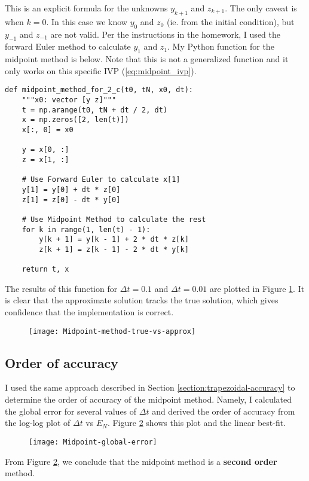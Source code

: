\documentclass{article}
\begin{document}
This is an explicit formula for the unknowns $y_{k+1}$ and $z_{k+1}$. The only caveat is when $k = 0$.  In this case we know $y_0$ and $z_0$ (ie. from the initial condition), but $y_{-1}$ and $z_{-1}$ are not valid.  Per the instructions in the homework, I used the forward Euler method to calculate $y_1$ and $z_1$. My Python function for the midpoint method is below.  Note that this is not a generalized function and it only works on this specific IVP (\ref{eq:midpoint_ivp}).
\begin{verbatim}
def midpoint_method_for_2_c(t0, tN, x0, dt):
    """x0: vector [y z]"""
    t = np.arange(t0, tN + dt / 2, dt)
    x = np.zeros([2, len(t)])
    x[:, 0] = x0

    y = x[0, :]
    z = x[1, :]

    # Use Forward Euler to calculate x[1]
    y[1] = y[0] + dt * z[0]
    z[1] = z[0] - dt * y[0]

    # Use Midpoint Method to calculate the rest
    for k in range(1, len(t) - 1):
        y[k + 1] = y[k - 1] + 2 * dt * z[k]
        z[k + 1] = z[k - 1] - 2 * dt * y[k]

    return t, x
\end{verbatim}
The results of this function for \(\Delta t = 0.1\) and \(\Delta t = 0.01\) are plotted in Figure \ref{fig:midpoint-approx}. It is clear that the approximate solution tracks the true solution, which gives confidence that the implementation is correct.
\begin{figure}[H]
	\centering
	\texttt{[image: Midpoint-method-true-vs-approx]}
	\caption{}
	\label{fig:midpoint-approx}
\end{figure}
\subsection{Order of accuracy}
I used the same approach described in Section \ref{section:trapezoidal-accuracy} to determine the order of accuracy of the midpoint method.  Namely, I calculated the global error for several values of $\Delta t$ and derived the order of accuracy from the log-log plot of $\Delta t$ vs $E_N$. Figure \ref{fig:midpoint-global-error} shows this plot and the linear best-fit.
\begin{figure}[H]
	\centering
	\texttt{[image: Midpoint-global-error]}
	\caption{}
	\label{fig:midpoint-global-error}
\end{figure}
From Figure \ref{fig:midpoint-global-error}, we conclude that the midpoint method is a \textbf{second order} method.
\end{document}
